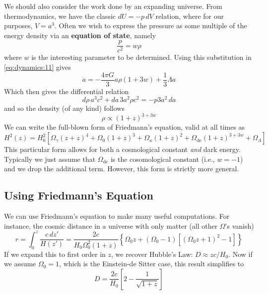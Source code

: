 \documentclass[10pt]{article}
\numberwithin{equation}{section}
\newcommand{\n}{\noindent}
\begin{document}
		\n We should also consider the work done by an expanding universe. From thermodynamics, we have the classic $dU = -p\,dV$ relation, where for our purposes, $V=a^3$. Often we wish to express the pressure as some multiple of the energy density via an \textbf{equation of state}, namely
		\begin{equation}
			\label{eq:dynamics:13} \frac{p}{c^2} = w\rho
		\end{equation}
		where $w$ is the interesting parameter to be determined. Using this substitution in \eqref{eq:dynamics:11} gives
		\begin{equation}
			\label{eq:dynamics:14} \ddot{a} = -\frac{4\pi G}{3} a\rho(1+3w)+\frac{1}{3}\Lambda a
		\end{equation}
		Which then gives the differential relation
		\begin{equation}
			\label{eq:dynamics:15} d\rho\,a^3 c^2 + da\,3a^2\rho c^2 = -p 3a^2\,da
		\end{equation}
		and so the density (of any kind) follows
		\begin{equation}
			\label{eq:dynamics:16} \rho \propto (1+z)^{3+3w}
		\end{equation}
		We can write the full-blown form of Friedmann's equation, valid at all times as
		\begin{equation}
			\label{eq:dynamics:17} \boxed{H^2(z) = H_0^2\left[\Omega_\gamma(z+z)^4 + \Omega_0(1+z)^3 + \Omega_\kappa(1+z)^2 + \Omega_{\mathrm{de}}(1+z)^{3+3w}+\Omega_\Lambda\right]}
		\end{equation}
		This particular form allows for both a cosmological constant \emph{and} dark energy. Typically we just assume that $\Omega_{\mathrm{de}}$ is the cosomological constant (i.e., $w=-1$) and we drop the additional term. However, this form is strictly more general.
	\subsection{Using Friedmann's Equation} %
	\label{sub:using_friedmann_s_equation}
		We can use Friedmann's equation to make many useful computations. For instance, the cosmic distance in a universe with only matter (all other $\Omega$'s vanish)
		\begin{equation}
			\label{eq:dynamics:18} r = \int_0^z \frac{c\,dz'}{H(z')} = \frac{2c}{H_0\Omega_0^2(1+z)}\left\{\Omega_0z+(\Omega_0-1)\left[(\Omega_0z+1)^2-1\right]\right\}
		\end{equation}
		If we expand this to first order in $z$, we recover Hubble's Law: $D\approx zc/H_0$. Now if we assume $\Omega_0=1$, which is the Einstein-de Sitter case, this result simplifies to
		\begin{equation}
			\label{eq:dynamics:19} D = \frac{2c}{H_0}\left[2-\frac{1}{\sqrt{1+z}}\right]
		\end{equation}
\end{document}
